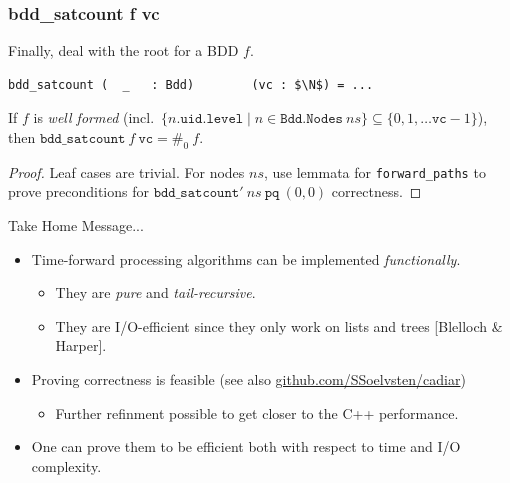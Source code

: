 \documentclass[english, aspectratio=169]{beamer}
\newcommand{\ns}[0]{\ensuremath{\mathit{ns}}}
\newcommand{\pq}[0]{\ensuremath{\texttt{pq}}}
\newcommand{\vc}[0]{\ensuremath{\texttt{vc}}}
\begin{document}
\begin{frame} %
  \frametitle{bdd\_satcount f vc}

  Finally, deal with the root for a BDD $f$.

  \begin{lstlisting}
bdd_satcount (  _   : Bdd)        (vc : $\N$) = ...
  \end{lstlisting}

  \begin{theorem}
    If $f$ is \emph{well formed} (incl.\
    $\{ n.\texttt{uid}.\texttt{level} \mid n \in \texttt{Bdd.Nodes}\ \ns \} \subseteq \{ 0, 1,
    \dots \vc-1 \}$),\\then $\texttt{bdd\_satcount}\ f\ \vc = \#_0\ f$.
  \end{theorem}
  \begin{proof}
    Leaf cases are trivial. For nodes \ns, use lemmata for \texttt{forward\_paths} to prove
    preconditions for $\texttt{bdd\_satcount}'\ \ns\ \pq\ (0,0)$ correctness.
  \end{proof}
\end{frame}

\blankframe

\begin{frame}
  \begin{center}
    \LARGE\bf

    Take Home Message...
  \end{center}

  \begin{itemize}
  \item Time-forward processing algorithms can be implemented \emph{functionally}.
    \begin{itemize}
    \item They are \emph{pure} and \emph{tail-recursive}.
    \item They are I/O-efficient since they only work on lists and trees [Blelloch \& Harper].
    \end{itemize}

    \bigskip

  \item Proving correctness is feasible (see also
    \href{https://github.com/SSoelvsten/cadiar}{github.com/SSoelvsten/cadiar})
    \begin{itemize}
    \item Further refinment possible to get closer to the C++ performance.
    \end{itemize}

    \bigskip

  \item One can prove them to be efficient both with respect to time and I/O complexity.
  \end{itemize}
\end{frame}
\end{document}
